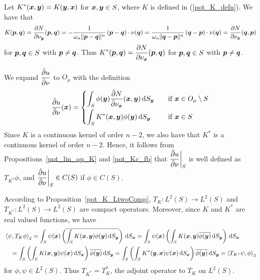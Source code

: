Let $\displaystyle K^\ast({\bm{x}},{\bm{y}}) = K({\bm{y}},{\bm{x}})$
for ${\bm{x}},{\bm{y}} \in S$,  where $K$ is defined in
(\ref{pot_K_defn}).  We have that
\[
K({\bm{p}},{\bm{q}}) = \frac{\partial{N}}{\partial \nu_{{\bm{y}}}}({\bm{p}},{\bm{q}})
= - \frac{1}{\omega_n \|{\bm{p}}-{\bm{q}}\|^n}\,({\bm{p}}-{\bm{q}})\cdot
\nu({\bm{q}})
= \frac{1}{\omega_n \|{\bm{q}}-{\bm{p}}\|^n}\,({\bm{q}}-{\bm{p}})\cdot
\nu({\bm{q}})
= \frac{\partial{N}}{\partial \nu_{{\bm{x}}}}({\bm{q}},{\bm{p}})
\]
for ${\bm{p}} , {\bm{q}} \in S$ with ${\bm{p}} \neq {\bm{q}}$.  Thus
$\displaystyle K^\ast({\bm{p}},{\bm{q}}) =
\frac{\partial{N}}{\partial \nu_{{\bm{x}}}}({\bm{p}},{\bm{q}})$ for
${\bm{p}} , {\bm{q}} \in S$ with ${\bm{p}} \neq {\bm{q}}$.

We expand $\displaystyle \frac{\tilde{\partial}{u}}{\tilde{\partial}{\nu}}$ to $O_\mu$ with
the definition
\begin{equation} \label{pot_dslp_def}
\frac{\tilde{\partial}{u}}{\tilde{\partial}{\nu}}({\bm{x}}) = 
\begin{cases}
\displaystyle
\int_S \phi({\bm{y}}) \frac{\tilde{\partial}{N}}{\tilde{\partial}{\nu_{{\bm{x}}}}}({\bm{x}},{\bm{y}})
\,\mathrm{d}{S}_{{\bm{y}}} & \quad \text{if} \ {\bm{x}} \in O_\mu \setminus S \\[0.8em]
\displaystyle
\int_S K^\ast({\bm{x}},{\bm{y}}) \phi({\bm{y}})
\,\mathrm{d}{S}_{{\bm{y}}} & \quad \text{if} \ {\bm{x}} \in S
\end{cases}
\end{equation}
Since $K$ is a continuous kernel of order $n-2$, we also have that
$\displaystyle K^\ast$ is 
a continuous kernel of order $n-2$.  Hence, it follows from
Propositions~\ref{pot_lin_op_K} and \ref{pot_Kc_fb} that
$\displaystyle \frac{\tilde{\partial}{u}}{\tilde{\partial}{\nu}} \bigg|_S$ is well defined as
$\displaystyle T_{K^\ast} \phi$, and
$\displaystyle \frac{\tilde{\partial}{u}}{\tilde{\partial}{\nu}}\bigg|_S \in C(S)$ if $\phi\in C(S)$.

According to Proposition~\ref{pot_K_LtwoComp},
$\displaystyle T_K:L^2(S)\rightarrow L^2(S)$ and
$\displaystyle T_{K^\ast}:L^2(S)\rightarrow L^2(S)$ are
compact operators.  Moreover, since $K$ and $\displaystyle K^\ast$ are
real valued functions, we have
\begin{align*}
&\left\langle{\psi} , {T_K\phi}\right\rangle_2 = \int_S \psi({\bm{x}}) \left(
\overline{\int_S K({\bm{x}},{\bm{y}})\phi({\bm{y}}) \,\mathrm{d}{S}_{{\bm{y}}}} \right) \,\mathrm{d}{S}_{{\bm{x}}}
=\int_S \psi({\bm{x}}) \left(
\int_S K({\bm{x}},{\bm{y}})\overline{\phi({\bm{y}})} \,\mathrm{d}{S}_{{\bm{y}}} \right)
\,\mathrm{d}{S}_{{\bm{x}}} \\
&\quad =\int_S \left( \int_S K({\bm{x}},{\bm{y}}) \psi({\bm{x}}) \,\mathrm{d}{S}_{{\bm{x}}}
\right) \overline{\phi({\bm{y}})} \,\mathrm{d}{S}_{{\bm{y}}}
=\int_S \left(
\int_S K^\ast({\bm{y}},{\bm{x}}) \psi({\bm{x}}) \,\mathrm{d}{S}_{{\bm{x}}}
\right) \overline{\phi({\bm{y}})} \,\mathrm{d}{S}_{{\bm{y}}} =
\left\langle{T_{K^\ast} \psi} , {\phi}\right\rangle_2
\end{align*}
for $\phi,\psi \in L^2(S)$.
Thus $\displaystyle T_{K^\ast} = T_K^\ast$, the adjoint operator to $T_K$ on
$\displaystyle L^2(S)$.


